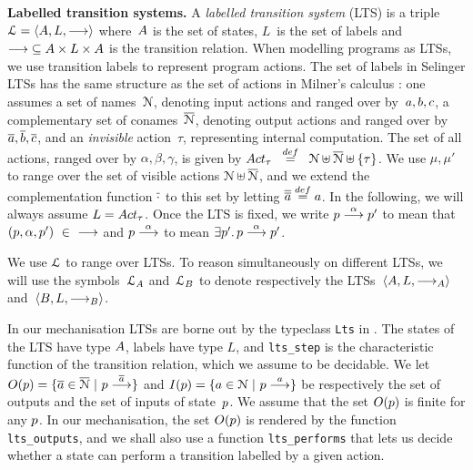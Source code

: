 
{\bfseries Labelled transition systems.}
A \emph{labelled transition system} (LTS) is a triple
$\mathcal{L} = \langle  A ,  L ,  \mathrel{\overset{}\longrightarrow}  \rangle$ where~$A$ is the set
of states, $L$~is the set of labels
  and ${\mathrel{\overset{}\longrightarrow}}
  \subseteq A \times L \times A$ is the transition
  relation.
  When modelling programs as LTSs, we use transition labels to
  represent program actions. The set of labels in Selinger LTSs has
  the same structure as the set of actions in Milner's calculus \CCS:
  one assumes a set of names~$\mathcal{N}$, denoting input actions and
  ranged over by~$a, b, c$, a complementary set of
  conames~$\overline{\mathcal{N}}$, denoting output actions and ranged over
  by $\overline{a}, \overline{b}, \overline{c}$, and an \emph{invisible}
  action~$\tau$, representing internal computation.
The set of all actions, ranged over by $\alpha, \beta, \gamma$,
is given by
$\Acttau \;\;\eqdef\;\; \Names \uplus \overline{\Names}
   \uplus \{ \tau \} $.
We use $\mu, \mu'$ to range over the set of visible actions $\mathcal{N}
\uplus \overline{\mathcal{N}}$, and we extend the complementation function
$\overline{\cdot}$ to this set by letting ${\co{\co \aa}} \eqdef \aa$.
In the following, we will always assume $L = \Acttau$.
Once the LTS is fixed, we write %
$p \mathrel{\overset{\alpha}\longrightarrow} p'$ to mean that
$(p,\alpha,p')~\in~{\mathrel{\overset{}\longrightarrow}}$ and $ p \mathrel{\overset{ \alpha }\longrightarrow}$
to mean $\exists p' . \, p \mathrel{\overset{\alpha}\longrightarrow} p'$.
%

We use $\mathcal{L}$ to range over LTSs. To reason
simultaneously on different LTSs, we will use the
symbols~$\mathcal{L}_A$ and~$\mathcal{L}_B$ to denote respectively
the LTSs~$\langle A, L, \mathrel{\overset{}\longrightarrow}_A \rangle$ and~$\langle B, L, \mathrel{\overset{}\longrightarrow}_B \rangle$.


In our mechanisation LTSs are borne out by the typeclass
\lstinline|Lts| in . The states of the LTS
have type $A$, labels have type $L$, and \lstinline|lts_step| is
the characteristic function of the transition relation, which we
assume to be decidable.  We let $O(p) = \{  \overline{a} \in \overline{\mathcal{N} } \ |\   p  \mathrel{\overset{ \overline{a}}\longrightarrow}  \}$
and $I(p) = \{  a \in \mathcal{N}  \ |\   p \mathrel{\overset{ a}\longrightarrow}  \}$ be respectively the set of
outputs and the set of inputs of state~$p$.  %
We assume that the set $O(p)$
  is finite for any $p$.
  In our mechanisation, the set
$O(p)$ is rendered by the function \lstinline|lts_outputs|,
and we shall also use a function \lstinline|lts_performs| that
lets us decide whether a state can
perform a transition labelled by a given action.


